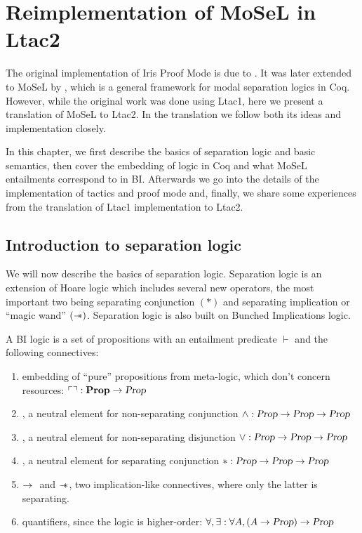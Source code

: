 \chapter{Reimplementation of MoSeL in Ltac2}
\label{chap:reimplementation_ipm}

The original implementation of Iris Proof Mode is due to \citet{krebbersInteractiveProofsHigherorder2017}.
It was later extended to MoSeL by \citet{krebbersMoSeLGeneralExtensible2018}, which is a general framework for modal separation logics in Coq.
However, while the original work was done using Ltac1, here we present a translation of MoSeL to Ltac2.
In the translation we follow both its ideas and implementation closely.

In this chapter, we first describe the basics of separation logic and basic semantics, then cover the embedding of logic in Coq and what MoSeL entailments correspond to in BI\@.
Afterwards we go into the details of the implementation of tactics and proof mode and, finally, we share some experiences from the translation of Ltac1 implementation to Ltac2.

\section{Introduction to separation logic}
\label{sec:separation-logic-intro}

We will now describe the basics of separation logic.
Separation logic is an extension of Hoare logic which includes several new operators, the most important two being separating conjunction \((*)\) and separating implication or ``magic wand'' \((\mathrel{-\mkern-6mu*})\).
Separation logic is also built on Bunched Implications logic.

A BI logic is a set of propositions \Prop with an entailment predicate \(\vdash\) and the following connectives:
\begin{enumerate}
\item embedding of ``pure'' propositions from meta-logic, which don't concern resources: \(\ulcorner   \urcorner : \textbf{Prop} \to \textsl{Prop}\)
\item \True, a neutral element for non-separating conjunction \(\wedge : \textsl{Prop} \to \textsl{Prop} \to \textsl{Prop}\)
\item \False, a neutral element for non-separating disjunction \(\vee : \textsl{Prop} \to \textsl{Prop} \to \textsl{Prop}\)
\item \emp, a neutral element for separating conjunction \(* : \textsl{Prop} \to \textsl{Prop} \to \textsl{Prop}\)
\item \(\mathbin{\rightarrow}~\) and \(\mathrel{-\mkern-6mu*}\), two implication-like connectives, where only the latter is separating.
\item quantifiers, since the logic is higher-order: \(\forall, \exists : \forall A, (A \to \textsl{Prop}) \to \textsl{Prop}\)
\end{enumerate}

